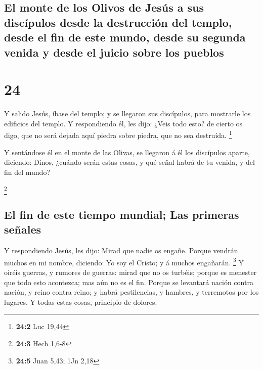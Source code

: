 \hypertarget{el-monte-de-los-olivos-de-jesuxfas-a-sus-discuxedpulos-desde-la-destrucciuxf3n-del-templo-desde-el-fin-de-este-mundo-desde-su-segunda-venida-y-desde-el-juicio-sobre-los-pueblos}{%
\subsection{El monte de los Olivos de Jesús a sus discípulos desde la
destrucción del templo, desde el fin de este mundo, desde su segunda
venida y desde el juicio sobre los
pueblos}\label{el-monte-de-los-olivos-de-jesuxfas-a-sus-discuxedpulos-desde-la-destrucciuxf3n-del-templo-desde-el-fin-de-este-mundo-desde-su-segunda-venida-y-desde-el-juicio-sobre-los-pueblos}}

\hypertarget{section-23}{%
\section{24}\label{section-23}}

 Y salido Jesús, íbase del templo; y se llegaron sus
discípulos, para mostrarle los edificios del templo.  Y
respondiendo él, les dijo: ¿Veis todo esto? de cierto os digo, que no
será dejada aquí piedra sobre piedra, que no sea destruída. \footnote{\textbf{24:2}
  Luc 19,44}

 Y sentándose él en el monte de las Olivas, se llegaron á él
los discípulos aparte, diciendo: Dinos, ¿cuándo serán estas cosas, y qué
señal habrá de tu venida, y del fin del mundo?

\footnote{\textbf{24:3} Hech 1,6-8}

\hypertarget{el-fin-de-este-tiempo-mundial-las-primeras-seuxf1ales}{%
\subsection{El fin de este tiempo mundial; Las primeras
señales}\label{el-fin-de-este-tiempo-mundial-las-primeras-seuxf1ales}}

 Y respondiendo Jesús, les dijo: Mirad que nadie os engañe.
 Porque vendrán muchos en mi nombre, diciendo: Yo soy el
Cristo; y á muchos engañarán. \footnote{\textbf{24:5} Juan 5,43; 1Jn
  2,18}  Y oiréis guerras, y rumores de guerras: mirad que
no os turbéis; porque es menester que todo esto acontezca; mas aún no es
el fin.  Porque se levantará nación contra nación, y reino
contra reino; y habrá pestilencias, y hambres, y terremotos por los
lugares.  Y todas estas cosas, principio de dolores.

